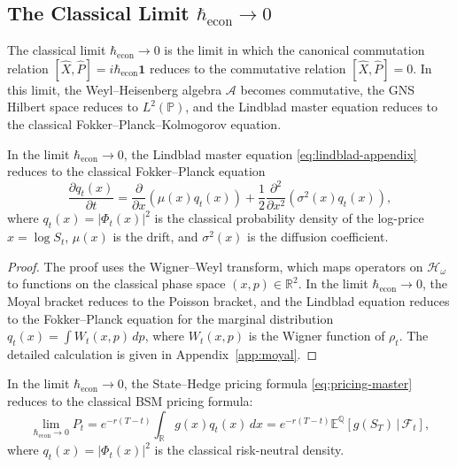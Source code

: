 \subsection{The Classical Limit $\hbar_{\mathrm{econ}} \to 0$}

The classical limit $\hbar_{\mathrm{econ}} \to 0$ is the limit in which the
canonical commutation relation $[\hat{X}, \hat{P}] = i\hbar_{\mathrm{econ}}
\mathbf{1}$ reduces to the commutative relation $[\hat{X}, \hat{P}] = 0$. In
this limit, the Weyl--Heisenberg algebra $\mathcal{A}$ becomes commutative, the
GNS Hilbert space reduces to $L^2(\mathbb{P})$, and the Lindblad master equation
reduces to the classical Fokker--Planck--Kolmogorov equation.

\begin{theorem}\label{thm:classical-limit-lindblad}
In the limit $\hbar_{\mathrm{econ}} \to 0$, the Lindblad master equation
\eqref{eq:lindblad-appendix} reduces to the classical Fokker--Planck equation
\begin{equation*}
    \frac{\partial q_t(x)}{\partial t} = \frac{\partial}{\partial x}
        \left(\mu(x) q_t(x)\right)
        + \frac{1}{2} \frac{\partial^2}{\partial x^2}
        \left(\sigma^2(x) q_t(x)\right),
\end{equation*}
where $q_t(x) = |\Phi_t(x)|^2$ is the classical probability density of the
log-price $x = \log S_t$, $\mu(x)$ is the drift, and $\sigma^2(x)$ is the
diffusion coefficient.
\end{theorem}

\begin{proof}
The proof uses the Wigner--Weyl transform, which maps operators on
$\mathcal{H}_\omega$ to functions on the classical phase space
$(x, p) \in \mathbb{R}^2$. In the limit $\hbar_{\mathrm{econ}} \to 0$, the Moyal
bracket reduces to the Poisson bracket, and the Lindblad equation reduces to the
Fokker--Planck equation for the marginal distribution
$q_t(x) = \int W_t(x, p) \, dp$, where $W_t(x, p)$ is the Wigner function of
$\rho_t$. The detailed calculation is given in Appendix~\ref{app:moyal}.
\end{proof}

\begin{corollary}\label{cor:classical-limit-pricing}
In the limit $\hbar_{\mathrm{econ}} \to 0$, the State--Hedge pricing formula
\eqref{eq:pricing-master} reduces to the classical BSM pricing formula:
\begin{equation*}
    \lim_{\hbar_{\mathrm{econ}} \to 0} P_t
    = e^{-r(T-t)} \int_{\mathbb{R}} g(x) q_t(x) \, dx
    = e^{-r(T-t)} \mathbb{E}^{\mathbb{Q}}[g(S_T) \,|\, \mathcal{F}_t],
\end{equation*}
where $q_t(x) = |\Phi_t(x)|^2$ is the classical risk-neutral density.
\end{corollary}

